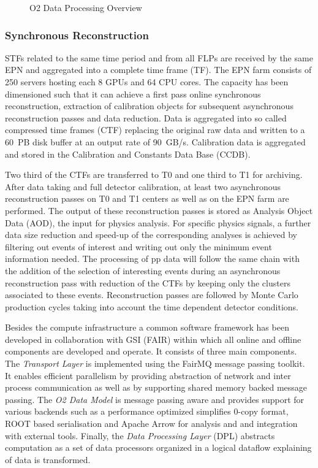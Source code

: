 \begin{figure*}[hbtp]
  \begin{center}
    \vspace*{10cm}
 \end{center}
 \caption{O2 Data Processing Overview}
 \label{fig:o2dp}
 \end{figure*}

\subsubsection{Synchronous Reconstruction}

STFs related to the same time period and from all FLPs are received by the same EPN and aggregated into 
a complete time frame (TF).
The EPN farm consists of 250 servers hosting each 8 GPUs and 
64 CPU cores. The capacity has been dimensioned such that it can achieve
a first pass online synchronous reconstruction, extraction of calibration 
objects for subsequent asynchronous reconstruction passes and data reduction. 
Data is aggregated into so called compressed time frames (CTF) replacing the original raw data and 
written to a 
60~PB disk buffer at an output rate of 90~GB/s. Calibration data is aggregated and stored in the 
Calibration and Constants Data Base (CCDB). 

Two third of the CTFs are transferred to T0 and one third to T1 for archiving. 
After data taking and full detector calibration, at least two asynchronous 
reconstruction passes on T0 and T1 centers as well as on the EPN farm are 
performed. The output of these reconstruction passes is stored as Analysis 
Object Data (AOD), the input for physics analysis. For specific physics signals, a further data size 
reduction and speed-up of the corresponding analyses is achieved by filtering out events of interest and writing out only the minimum event information needed.
The processing of pp data will follow the same chain with the addition of the selection of interesting 
events during an asynchronous reconstruction pass with reduction of the CTFs by keeping only the 
clusters associated to these events. Reconstruction passes are followed by Monte Carlo production cycles taking into account the time dependent detector conditions.

Besides the compute infrastructure a common software framework has
been developed in collaboration with GSI (FAIR) within which all 
online and offline components are developed and operate. It 
consists of three main components. 
The {\it Transport Layer} is implemented using the FairMQ message 
passing toolkit. It enables efficient parallelism by providing 
abstraction of network and inter process communication as well as 
by supporting shared memory backed message passing. The {\it O2 Data 
Model} is message passing aware and provides support for various 
backends such as a performance optimized simplifies 0-copy format, ROOT based serialisation and Apache Arrow for analysis and and 
integration with external tools. Finally, the {\it Data Processing
Layer} (DPL) abstracts computation as a set of data processors 
organized in a logical dataflow explaining of data is transformed.

